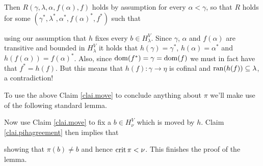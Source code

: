 \documentclass[../main]{subfiles}
\begin{document}
{{    Then $R(\gamma,\lambda,\alpha,f(\alpha),f)$ holds by assumption for every $\alpha<\gamma$, so that $R$ holds for some $(\gamma^*,\lambda^*,\alpha^*,f(\alpha)^*,f^*)$ such that

     using our assumption that $h$ fixes every $b\in H_\lambda^V$. Since $\gamma$, $\alpha$ and $f(\alpha)$ are transitive and bounded in $H_\lambda^V$ it holds that $h(\gamma)=\gamma^*$, $h(\alpha)=\alpha^*$ and $h(f(\alpha))=f(\alpha)^*$. Also, since $\operatorname{dom}(f^*)=\gamma=\operatorname{dom}(f)$ we must in fact have that $f^*=h(f)$. But this means that $h(f)\colon\gamma\to\eta$ is cofinal and $\operatorname{ran}(h(f))\subseteq\lambda$, a contradiction!
  }
  
  To use the above Claim \ref{clai.move} to conclude anything about $\pi$ we'll make use of the following standard lemma.



  Now use Claim \ref{clai.move} to fix a $b\in H_\nu^V$ which is moved by $h$. Claim \ref{clai.pihagreement} then implies that

  showing that $\pi(b)\neq b$ and hence $\operatorname{crit}\pi<\nu$. This finishes the proof of the lemma.
}
\end{document}
